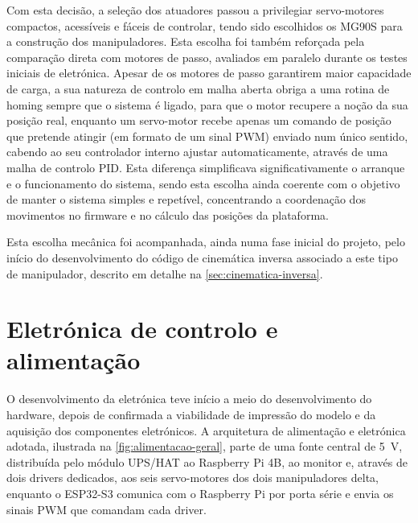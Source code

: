 Com esta decisão, a seleção dos atuadores passou a privilegiar servo-motores compactos, acessíveis e fáceis de controlar, tendo sido escolhidos os MG90S para a construção dos manipuladores. Esta escolha foi também reforçada pela comparação direta com motores de passo, avaliados em paralelo durante os testes iniciais de eletrónica. Apesar de os motores de passo garantirem maior capacidade de carga, a sua natureza de controlo em malha aberta obriga a uma rotina de homing sempre que o sistema é ligado, para que o motor recupere a noção da sua posição real, enquanto um servo-motor recebe apenas um comando de posição que pretende atingir (em formato de um sinal PWM) enviado num único sentido, cabendo ao seu controlador interno ajustar automaticamente, através de uma malha de controlo PID. Esta diferença simplificava significativamente o arranque e o funcionamento do sistema, sendo esta escolha ainda coerente com o objetivo de manter o sistema simples e repetível, concentrando a coordenação dos movimentos no firmware e no cálculo das posições da plataforma.

Esta escolha mecânica foi acompanhada, ainda numa fase inicial do projeto, pelo início do desenvolvimento do código de cinemática inversa associado a este tipo de manipulador, descrito em detalhe na \cref{sec:cinematica-inversa}.

\section{Eletrónica de controlo e alimentação}
\label{sec:eletronica-alimentacao}
O desenvolvimento da eletrónica teve início a meio do desenvolvimento do hardware, depois de confirmada a viabilidade de impressão do modelo e da aquisição dos componentes eletrónicos. A arquitetura de alimentação e eletrónica adotada, ilustrada na \cref{fig:alimentacao-geral}, parte de uma fonte central de \SI{5}{\volt}, distribuída pelo módulo UPS/HAT ao Raspberry Pi 4B, ao monitor e, através de dois drivers dedicados, aos seis servo-motores dos dois manipuladores delta, enquanto o ESP32-S3 comunica com o Raspberry Pi por porta série e envia os sinais PWM que comandam cada driver.

